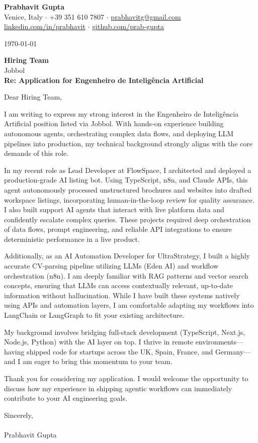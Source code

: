 \documentclass[11pt,a4paper]{article}
\begin{document}
\pagestyle{empty}

\begin{center}
    {\Huge \textbf{Prabhavit Gupta}} \\[6pt]
    Venice, Italy $\cdot$ +39 351 610 7807 $\cdot$ \href{mailto:prabhavitg@gmail.com}{prabhavitg@gmail.com} \\[2pt]
    \href{https://www.linkedin.com/in/prabhavit/}{linkedin.com/in/prabhavit} $\cdot$ \href{https://github.com/prab-gupta}{github.com/prab-gupta}
\end{center}

\vspace{20pt}

\today

\textbf{Hiring Team} \\
Jobbol \\

\textbf{Re: Application for Engenheiro de Inteligência Artificial}

Dear Hiring Team,

I am writing to express my strong interest in the Engenheiro de Inteligência Artificial position listed via Jobbol. With hands-on experience building autonomous agents, orchestrating complex data flows, and deploying LLM pipelines into production, my technical background strongly aligns with the core demands of this role. 

In my recent role as Lead Developer at FlowSpace, I architected and deployed a production-grade AI listing bot. Using TypeScript, n8n, and Claude APIs, this agent autonomously processed unstructured brochures and websites into drafted workspace listings, incorporating human-in-the-loop review for quality assurance. I also built support AI agents that interact with live platform data and confidently escalate complex queries. These projects required deep orchestration of data flows, prompt engineering, and reliable API integrations to ensure deterministic performance in a live product.

Additionally, as an AI Automation Developer for UltraStrategy, I built a highly accurate CV-parsing pipeline utilizing LLMs (Eden AI) and workflow orchestration (n8n). I am deeply familiar with RAG patterns and vector search concepts, ensuring that LLMs can access contextually relevant, up-to-date information without hallucination. While I have built these systems natively using APIs and automation layers, I am comfortable adapting my workflows into LangChain or LangGraph to fit your existing architecture.

My background involves bridging full-stack development (TypeScript, Next.js, Node.js, Python) with the AI layer on top. I thrive in remote environments—having shipped code for startups across the UK, Spain, France, and Germany—and I am eager to bring this momentum to your team. 

Thank you for considering my application. I would welcome the opportunity to discuss how my experience in shipping agentic workflows can immediately contribute to your AI engineering goals. 

Sincerely, \\
\vspace{10pt} \\
Prabhavit Gupta
\end{document}
